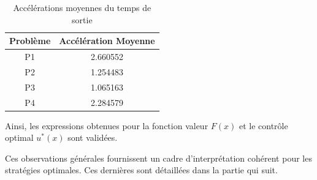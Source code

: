 \begin{itemize}
    \begin{table}[htb]
        \centering
        \caption{Accélérations moyennes du temps de sortie}\label{tab:acceleration_results}
        \renewcommand{\arraystretch}{1.1}
        \begin{tabular}{||c|c||}
        \hline
        Problème & Accélération Moyenne \\\hline\hline
        P1 & 2.660552 \\
        P2 & 1.254483 \\
        P3 & 1.065163 \\
        P4 & 2.284579 \\
        \hline
        \end{tabular}
    \end{table}
\end{itemize}\FloatBarrier Ainsi, les expressions obtenues pour la fonction valeur $F(x)$ et le contrôle optimal $u^*(x)$ sont validées.

Ces observations générales fournissent un cadre d'interprétation cohérent pour les stratégies optimales. Ces dernières sont détaillées dans la partie qui suit.
